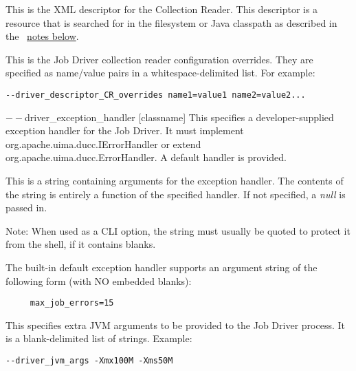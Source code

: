 \begin{description}
           \item[$--$driver\_descriptor\_CR {[descriptor.xml]} ] This is the XML descriptor for the
             Collection Reader.  This 
             descriptor is a resource that is searched for in the filesystem or Java classpath as described 
             in the ~\hyperref[par:cli.submit.notes]{notes below}.

           \item[$--$driver\_descriptor\_CR\_overrides {[list]} ]             
             This is the Job Driver collection reader configuration overrides. They are specified as 
             name/value pairs in a whitespace-delimited list. For example: 
             \begin{verbatim}
--driver_descriptor_CR_overrides name1=value1 name2=value2...
             \end{verbatim}
             
           \begin{sloppypar}
           \item[$--$driver\_exception\_handler {[classname]}] This specifies a developer-supplied
             exception handler for the Job Driver.  It must
             implement org.apache.uima.ducc.IErrorHandler or extend
             org.apache.uima.ducc.ErrorHandler.  A default handler is provided.
           \end{sloppypar}
           
           \item[$--$driver\_exception\_handler\_arguments {[argument-string]}] This is a string
             containing arguments for the exception handler.  The contents of
             the string is entirely a function of the specified handler.  If not specified,
             a {\em null} is passed in.

             Note: When used as a CLI option, the string must usually be
             quoted to protect it from the shell, if it contains blanks.

             The built-in default exception handler supports an argument string of the following form
             (with NO embedded blanks):
\begin{verbatim}
     max_job_errors=15
\end{verbatim}

           \item[$--$driver\_jvm\_args {[list]} ]

             This specifies extra JVM arguments to be provided to the Job Driver process. It is a blank-delimited 
             list of strings. Example: 
             \begin{verbatim}
--driver_jvm_args -Xmx100M -Xms50M 
             \end{verbatim}


\end{description}
